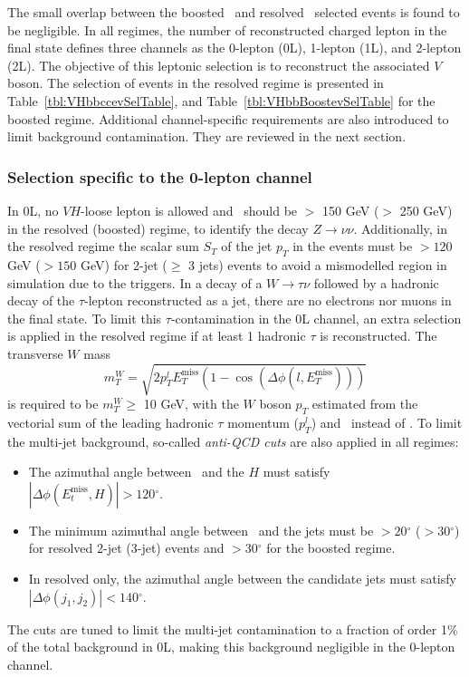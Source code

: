 The small overlap between the boosted \vhb\ and resolved \vhc\ selected events is found to be negligible. In all regimes, the number of reconstructed charged lepton in the final state defines three channels as the 0-lepton (0L), 1-lepton (1L), and 2-lepton (2L). The objective of this leptonic selection is to reconstruct the associated $V$ boson. The selection of events in the resolved regime is presented in Table~\ref{tbl:VHbbccevSelTable}, and Table~\ref{tbl:VHbbBoostevSelTable} for the boosted regime. Additional channel-specific requirements are also introduced to limit background contamination. They are reviewed in the next section.

\subsubsection{Selection specific to the 0-lepton channel}\label{subsubsec-0Lsel}
In 0L, no $VH$-loose lepton is allowed and \etm\ should be $>$ 150 GeV ($>$ 250 GeV) in the resolved (boosted) regime, to identify the decay $Z \rightarrow \nu\nu$. Additionally, in the resolved regime the scalar sum $S_T$ of the jet $p_T$ in the events must be $> 120$ GeV ($> 150$ GeV) for 2-jet ($\geq$ 3 jets) events to avoid a mismodelled region in simulation due to the triggers. In a decay of a $W \rightarrow \tau \nu$ followed by a hadronic decay of the $\tau$-lepton reconstructed as a jet, there are no electrons nor muons in the final state. To limit this $\tau$-contamination in the 0L channel, an extra selection is applied in the resolved regime if at least 1 hadronic $\tau$ is reconstructed. The transverse $W$ mass \[ m_T^W = \sqrt{2 p_T^l E_T^{\textrm{miss}} (1 - \cos(\Delta \phi(l, E_T^{\textrm{miss}} ) ) ) } \] is required to be $m_T^W \geq$ 10 GeV, with the $W$ boson $p_T$ estimated from the vectorial sum of the leading hadronic $\tau$ momentum ($p_T^l$) and \etm\ instead of \ptv. To limit the multi-jet background, so-called \textit{anti-QCD cuts} are also applied in all regimes:
\begin{itemize}
    \item The azimuthal angle between \etm\ and the $H$ must satisfy $|\Delta \phi(E_t^{\textrm{miss}}, H)| > 120 \ensuremath{^\circ}$.
    \item The minimum azimuthal angle between \etm\ and the jets must be $> 20\ensuremath{^\circ}$ ($> 30 \ensuremath{^\circ}$) for resolved 2-jet (3-jet) events and $> 30\ensuremath{^\circ}$ for the boosted regime.
    \item In resolved only, the azimuthal angle between the candidate jets must satisfy $|\Delta \phi(j_1, j_2)| < 140 \ensuremath{^\circ}$.
\end{itemize}
The cuts are tuned to limit the multi-jet contamination to a fraction of order 1\% of the total background in 0L, making this background negligible in the 0-lepton channel. 

